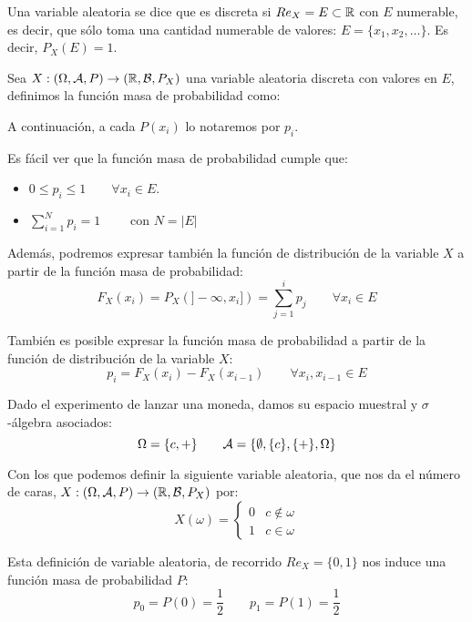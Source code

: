\begin{definicion}
    Una variable aleatoria se dice que es discreta si $Re_X = E \subset \mathbb R$ con $E$ numerable, es decir, que sólo toma una cantidad numerable de valores: $E = \{x_1, x_2, \ldots\}$. Es decir, $P_X(E)=1$.
\end{definicion}

\begin{definicion}
    Sea $X: (\Omega, \mathcal{A}, P) \rightarrow (\mathbb R, \mathcal{B}, P_X)$ una variable aleatoria discreta con valores en $E$, definimos la función masa de probabilidad como:
\end{definicion}
\begin{notacion}
    A continuación, a cada $P(x_i)$ lo notaremos por $p_i$.
\end{notacion}


\noindent Es fácil ver que la función masa de probabilidad cumple que:
\begin{itemize}
    \item $0 \leq p_i \leq 1 \qquad \forall x_i \in E$.
    \item $\sum\limits_{i = 1}^N p_i = 1 \qquad $ con $N = |E|$
\end{itemize}


Además, podremos expresar también la función de distribución de la variable $X$ a partir de la función masa de probabilidad:
$$F_X(x_i) = P_X(]-\infty, x_i]) = \sum_{j=1}^i p_j \qquad \forall x_i \in E$$


También es posible expresar la función masa de probabilidad a partir de la función de distribución de la variable $X$:
$$p_i = F_X(x_i) - F_X(x_{i-1}) \qquad \forall x_i,x_{i-1}\in E$$

\begin{ejemplo}
    Dado el experimento de lanzar una moneda, damos su espacio muestral y $\sigma$-álgebra asociados:
    $$\Omega = \{c, +\} \qquad \mathcal{A}=\{\emptyset, \{c\}, \{+\}, \Omega\}$$
    
    Con los que podemos definir la siguiente variable aleatoria, que nos da el número de caras,
    $X:(\Omega, \mathcal{A}, P) \rightarrow (\mathbb R, \mathcal{B}, P_X)$ por:
    $$X(\omega) = \left\{ \begin{array}{cc}
        0 & c \notin \omega \\
        1 & c \in \omega
    \end{array} \right.$$
    
    Esta definición de variable aleatoria, de recorrido $Re_X = \{0,1\}$ nos induce una función masa de probabilidad $P$:
    $$p_0 = P(0) = \frac{1}{2} \qquad p_1 = P(1) = \frac{1}{2}$$
\end{ejemplo}

